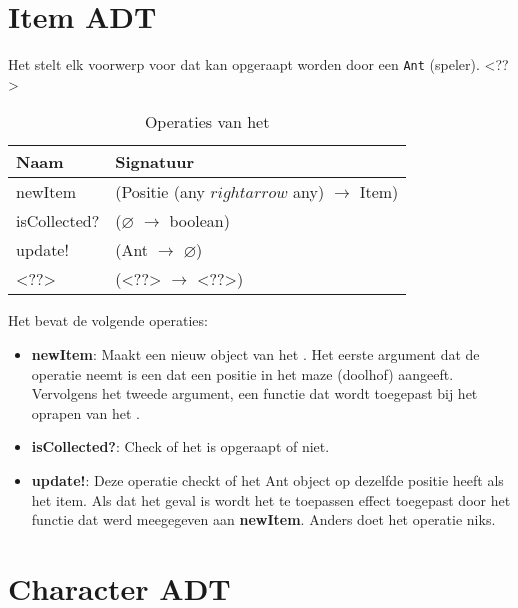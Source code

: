 \section{Item ADT}
\label{section:item}

Het \texttt{} stelt elk voorwerp voor dat kan opgeraapt  worden door een \texttt{Ant} (speler).
<??>

\begin{table}[hbt]
\centering
\begin{tabular}{|ll|}
\hline
\rowcolor[HTML]{000000} 
{\color[HTML]{FFFFFF} \textbf{Naam}} & {\color[HTML]{FFFFFF} \textbf{Signatuur}} \\ \hline
newItem                              & (Positie (any $rightarrow$ any) $\rightarrow$ Item) \\ \hline
isCollected?                         & ($\varnothing$ $\rightarrow$ boolean)               \\ \hline
update!                              & (Ant $\rightarrow$ $\varnothing$)                   \\ \hline
 <??>                                & (<??> $\rightarrow$ <??>)                           \\ \hline
\end{tabular}
\caption{Operaties van het \texttt{}}
\label{table:item}
\end{table}

Het \texttt{} bevat de volgende operaties:

\begin{itemize}
	\item \textbf{newItem}: Maakt een nieuw object van het \texttt{}.
		Het eerste argument dat de operatie neemt is een \texttt{} dat een positie in het maze (doolhof) aangeeft.
		Vervolgens het tweede argument, een functie dat wordt toegepast bij het oprapen van het \texttt{}.
	\item \textbf{isCollected?}: Check of het \texttt{} is opgeraapt of niet.
	\item \textbf{update!}: Deze operatie checkt of het Ant object op dezelfde positie heeft als het item.
		Als dat het geval is wordt het te toepassen effect toegepast door het functie dat werd meegegeven aan \textbf{newItem}.
		Anders doet het operatie niks.
\end{itemize}

\section{Character ADT}
\label{section:character}

